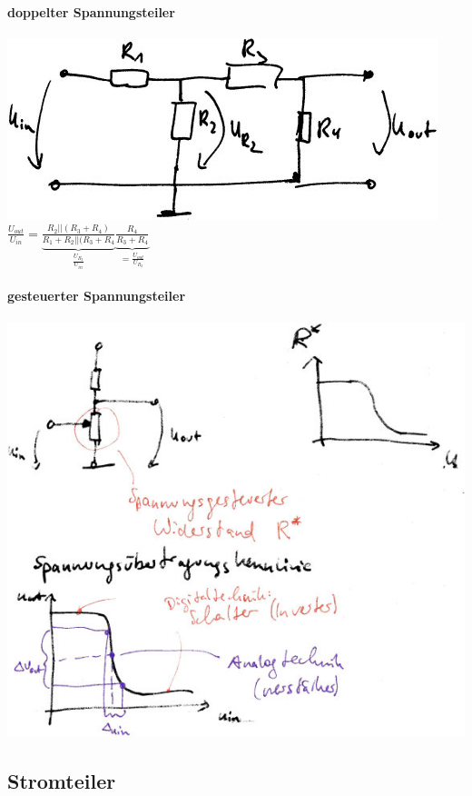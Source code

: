 \paragraph{doppelter Spannungsteiler} \parskp
\includegraphics[scale=.75]{Abbildungen/ABB212}\\
$\frac{U_{out}}{U_{in}}=\underbrace{\frac{R_2|| (R_3+R_4)}{R_1+R_2||(R_3+R_4}}_{\frac{U_{R_2}}{U_{in}}} \underbrace{\frac{R_4}{R_3+R_4}}_{=\frac{U_{out}}{U_{R_2}}}$

\paragraph{gesteuerter Spannungsteiler}\parskp
\includegraphics[scale=.75]{Abbildungen/ABB301}

\subsection{Stromteiler}

